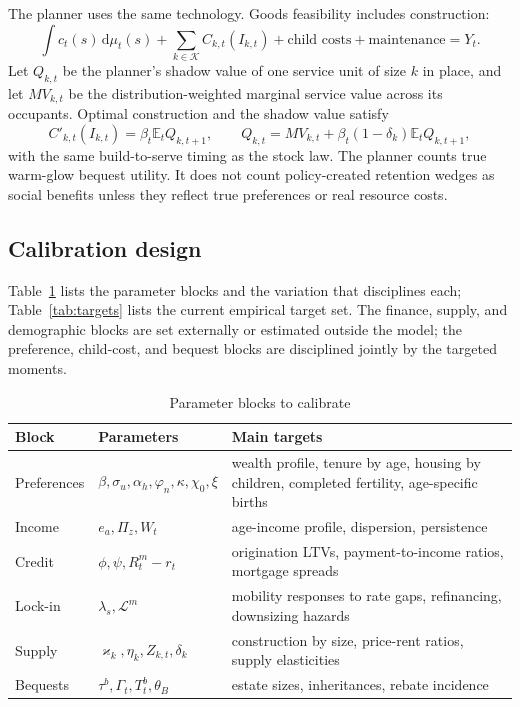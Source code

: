 \documentclass[11pt]{article}
\newcommand{\dd}{\mathrm d}
\newcommand{\E}{\mathbb E}
\newcommand{\1}{\mathbf 1}
\newcommand{\KK}{\mathcal K}
\begin{document}
The planner uses the same technology. Goods feasibility includes construction:
\begin{equation}
\int c_t(s)\,\dd\mu_t(s)+\sum_{k\in\KK}C_{k,t}(I_{k,t})+\text{child costs}+\text{maintenance}=Y_t.
\end{equation}
Let $Q_{k,t}$ be the planner's shadow value of one service unit of size $k$ in place, and let $MV_{k,t}$ be the distribution-weighted marginal service value across its occupants. Optimal construction and the shadow value satisfy
\begin{equation}
C'_{k,t}(I_{k,t})=\beta_t\E_t Q_{k,t+1},
\qquad
Q_{k,t}=MV_{k,t}+\beta_t(1-\delta_k)\E_tQ_{k,t+1},
\label{eq:planner_supply_quant}
\end{equation}
with the same build-to-serve timing as the stock law.
The planner counts true warm-glow bequest utility. It does not count policy-created retention wedges as social benefits unless they reflect true preferences or real resource costs.

\subsection{Calibration design}
\label{sec:quant_calib}

Table~\ref{tab:blocks} lists the parameter blocks and the variation that disciplines each; Table~\ref{tab:targets} lists the current empirical target set. The finance, supply, and demographic blocks are set externally or estimated outside the model; the preference, child-cost, and bequest blocks are disciplined jointly by the targeted moments.

\begin{table}[H]
\centering
\caption{Parameter blocks to calibrate}
\label{tab:blocks}
\small
\begin{tabularx}{\textwidth}{@{}l l X@{}}
\toprule
Block & Parameters & Main targets \\
\midrule
Preferences & $\beta,\sigma_u,\alpha_h,\varphi_n,\kappa,\chi_0,\xi$ & wealth profile, tenure by age, housing by children, completed fertility, age-specific births \\
Income & $e_a,\Pi_z,W_t$ & age-income profile, dispersion, persistence \\
Credit & $\phi,\psi,R_t^m-r_t$ & origination LTVs, payment-to-income ratios, mortgage spreads \\
Lock-in & $\lambda_s,\mathcal L^m$ & mobility responses to rate gaps, refinancing, downsizing hazards \\
Supply & $\varkappa_k,\eta_k,Z_{k,t},\delta_k$ & construction by size, price-rent ratios, supply elasticities \\
Bequests & $\tau^b,\Gamma_t,T_t^b,\theta_B$ & estate sizes, inheritances, rebate incidence \\
\bottomrule
\end{tabularx}
\end{table}
\end{document}
